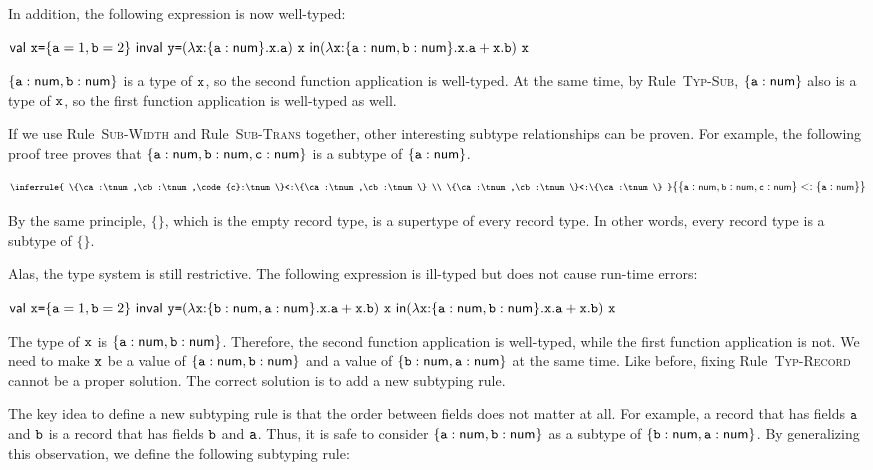 In addition, the following expression is now well-typed:

$
\ebind{\cx}{\{\ca=1,\cb=2\}}{\\
\ebind{\cy}{(\efunt{\cx}{\{\ca:\tnum\}}{\cx.\ca})\ \cx}{\\
(\efunt{\cx}{\{\ca:\tnum,\cb:\tnum\}}{\cx.\ca+\cx.\cb})\ \cx
}}
$

$\{\texttt{a}:\textsf{num},\texttt{b}:\textsf{num}\}$ is a type of $\texttt{x}$, so the second function application
is well-typed. At the same time, by Rule~\textsc{Typ-Sub}, $\{\texttt{a}:\textsf{num}\}$ also
is a type of $\texttt{x}$, so the first function application is well-typed as well.

If we use Rule~\textsc{Sub-Width} and Rule~\textsc{Sub-Trans} together,
other interesting subtype relationships can be proven. For example, the following
proof tree proves that $\{\texttt{a}:\textsf{num},\texttt{b}:\textsf{num},\texttt{c}:\textsf{num}\}$ is a subtype of
$\{\texttt{a}:\textsf{num}\}$.

\[
  \footnotesize
  \inferrule
  { \{\ca:\tnum,\cb:\tnum,\code{c}:\tnum\}<:\{\ca:\tnum,\cb:\tnum\} \\
    \{\ca:\tnum,\cb:\tnum\}<:\{\ca:\tnum\} }
  { \{\ca:\tnum,\cb:\tnum,\code{c}:\tnum\}<:\{\ca:\tnum\} }
\]

By the same principle, $\{\}$, which is the empty record type, is a supertype
of every record type. In other words, every record type is a subtype of
$\{\}$.

Alas, the type system is still restrictive. The following expression is ill-typed but
does not cause run-time errors:

$
\ebind{\cx}{\{\ca=1,\cb=2\}}{\\
\ebind{\cy}{(\efunt{\cx}{\{\cb:\tnum,\ca:\tnum\}}{\cx.\ca+\cx.\cb})\ \cx}{\\
(\efunt{\cx}{\{\ca:\tnum,\cb:\tnum\}}{\cx.\ca+\cx.\cb})\ \cx
}}
$

The type of $\texttt{x}$ is $\{\texttt{a}:\textsf{num},\texttt{b}:\textsf{num}\}$. Therefore, the second function
application is well-typed, while the first function application is not.
We need to make $\texttt{x}$ be a value of $\{\texttt{a}:\textsf{num},\texttt{b}:\textsf{num}\}$ and a value of
$\{\texttt{b}:\textsf{num},\texttt{a}:\textsf{num}\}$ at the same time. Like before, fixing
Rule~\textsc{Typ-Record} cannot be a proper solution. The correct solution is to
add a new subtyping rule.

The key idea to define a new subtyping rule is that the order between fields
does not matter at all. For example, a record that has fields $\texttt{a}$ and $\texttt{b}$ is
a record that has fields $\texttt{b}$ and $\texttt{a}$. Thus, it is safe to consider
$\{\texttt{a}:\textsf{num},\texttt{b}:\textsf{num}\}$ as a subtype of $\{\texttt{b}:\textsf{num},\texttt{a}:\textsf{num}\}$. By
generalizing this observation, we define the following subtyping rule:

